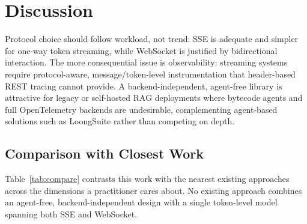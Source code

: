 \documentclass[11pt]{article}
\begin{document}
\section{Discussion}
Protocol choice should follow workload, not trend: SSE is adequate and simpler for one-way token streaming, while WebSocket is justified by bidirectional interaction. The more consequential issue is observability: streaming systems require protocol-aware, message/token-level instrumentation that header-based REST tracing cannot provide. A backend-independent, agent-free library is attractive for legacy or self-hosted RAG deployments where bytecode agents and full OpenTelemetry backends are undesirable, complementing agent-based solutions such as LoongSuite \cite{alibabaws2026} rather than competing on depth.

\subsection{Comparison with Closest Work}
Table~\ref{tab:compare} contrasts this work with the nearest existing approaches across the dimensions a practitioner cares about. No existing approach combines an agent-free, backend-independent design with a single token-level model spanning both SSE and WebSocket.
\end{document}
